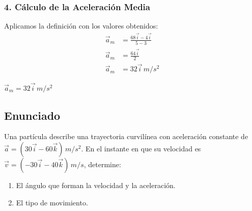 \documentclass[12pt, a4paper]{article}
\begin{document}
\subsubsection*{4. Cálculo de la Aceleración Media}

Aplicamos la definición con los valores obtenidos:
\begin{align*}
    \vec{a}_m &= \frac{68 \vec{i} - 4 \vec{i}}{5 - 3} \\
    \vec{a}_m &= \frac{64 \vec{i}}{2} \\
    \vec{a}_m &= 32 \vec{i} \, \si{m/s^2}
\end{align*}

\begin{tcolorbox}[colback=green!5!white, colframe=green!50!black, title=Respuesta Final]
\centering \Large $\vec{a}_m = 32 \vec{i} \, \si{m/s^2}$
\end{tcolorbox}

\newpage

\subsection*{Enunciado}

Una partícula describe una trayectoria curvilínea con aceleración constante de $\vec{a} = (30 \vec{i} - 60 \vec{k}) \, \si{m/s^2}$. En el instante en que su velocidad es $\vec{v} = (-30 \vec{i} - 40 \vec{k}) \, \si{m/s}$, determine:
\begin{enumerate}[label=\alph*)]
    \item El ángulo que forman la velocidad y la aceleración.
    \item El tipo de movimiento.
\end{enumerate}

\begin{center}
\end{center}
\end{document}
